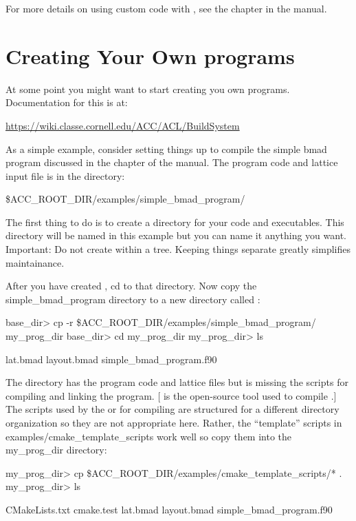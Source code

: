 \documentclass{report}
\begin{document}
For more details on using custom code with , see the  chapter
in the  manual.

\section{Creating Your Own programs}

At some point you might want to start creating you own programs. Documentation for this is
at:
\begin{example}
  \url{https://wiki.classe.cornell.edu/ACC/ACL/BuildSystem}
\end{example}

As a simple example, consider setting things up to compile the simple bmad program
discussed in the  chapter of the \bmad manual.
The program code and lattice input file is in the directory:
\begin{example}
  \$ACC_ROOT_DIR/examples/simple_bmad_program/
\end{example}

The first thing to do is to create a  directory for your code and executables. This
directory will be named  in this example but you can name it anything you
want. Important: Do not create  within a  tree. Keeping things
separate greatly simplifies maintainance.

After you have created , cd to that directory. Now copy the
simple_bmad_program directory to a new directory called :
\begin{example}
  base_dir> cp -r \$ACC_ROOT_DIR/examples/simple_bmad_program/ my_prog_dir
  base_dir> cd my_prog_dir
  my_prog_dir> ls

  lat.bmad   layout.bmad   simple_bmad_program.f90
\end{example}

The  directory has the program code and lattice files but is
missing the  scripts for compiling and linking the program.  [ is the
open-source tool used to compile \bmad.] The scripts used by the  or
 for compiling are structured for a different directory organization so they
are not appropriate here. Rather, the ``template'' scripts in
examples/cmake_template_scripts work well so copy them into the my_prog_dir
directory:
\begin{example}
  my_prog_dir> cp \$ACC_ROOT_DIR/examples/cmake_template_scripts/* .
  my_prog_dir> ls

  CMakeLists.txt  cmake.test  lat.bmad  layout.bmad simple_bmad_program.f90
\end{example}
\end{document}

